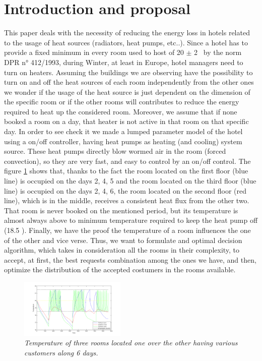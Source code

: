 \documentclass[letterpaper, 10 pt, conference]{ieeeconf}
\begin{document}
\section{Introduction and proposal}
This paper deals with the necessity of reducing the energy loss in hotels related to the usage of heat sources (radiators, heat pumps, etc..).
Since a hotel has to provide a fixed minimum in every room used to host of 20 $\pm$ 2 \textcelsius \ by the norm DPR n° 412/1993, during Winter, at least in Europe, hotel managers need to turn on heaters. Assuming the buildings we are observing have the possibility to turn on and off the heat sources of each room independently from the other ones we wonder if the usage of the heat source is just dependent on the dimension of the specific room or if the other rooms will contributes to reduce the energy required to heat up the considered room. Moreover, we assume that if none booked a room on a day, that heater is not active in that room on that specific day. In order to see check it we made a lumped parameter model of the hotel using a on/off controller, having heat pumps as heating (and cooling) system source. These heat pumps directly blow wormed air in the room (forced convection), so they are very fast, and easy to control by an on/off control. The figure \ref{figTemper_onoff} shows that, thanks to the fact the room located on the first floor (blue line) is occupied on the days 2, 4, 5 and the room located on the third floor (blue line) is occupied on the days 2, 4, 6, the room located on the second floor (red line), which is in the middle, receives a consistent heat flux from the other two. That room is never booked on the mentioned period, but its temperature is almost always above to minimum temperature required to keep the heat pump off (18.5 \textcelsius).
Finally, we have the proof the temperature of a room influences the one of the other and vice verse. Thus, we want to formulate and optimal decision algorithm, which takes in consideration all the rooms in their complexity, to accept, at first, the best requests combination among the ones we have, and then, optimize the distribution of the accepted costumers in the rooms available. 

\begin{figure}[htbp]
	\centering
	\includegraphics[width=0.45\textwidth, height=0.22\textwidth]{img/temperature_anal.png}
	\caption{\textit{Temperature of three rooms located one over the other having various customers along 6 days.}}
	\label{figTemper_onoff}
\end{figure}
\end{document}
